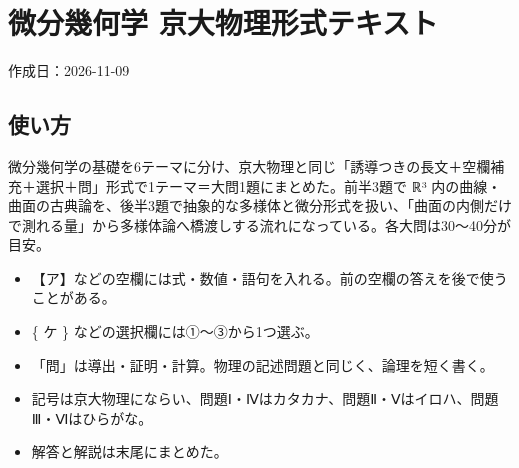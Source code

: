 \documentclass[
  10pt,
  a4paper,
]{article}
\author{}
\date{}
\providecommand{\tightlist}{%
  \setlength{\itemsep}{0pt}\setlength{\parskip}{0pt}}
\begin{document}
\hypertarget{ux5faeux5206ux5e7eux4f55ux5b66-ux4eacux5927ux7269ux7406ux5f62ux5f0fux30c6ux30adux30b9ux30c8}{%
\section{微分幾何学
京大物理形式テキスト}\label{ux5faeux5206ux5e7eux4f55ux5b66-ux4eacux5927ux7269ux7406ux5f62ux5f0fux30c6ux30adux30b9ux30c8}}

作成日：2026-11-09

\hypertarget{ux4f7fux3044ux65b9}{%
\subsection{使い方}\label{ux4f7fux3044ux65b9}}

微分幾何学の基礎を6テーマに分け、京大物理と同じ「誘導つきの長文＋空欄補充＋選択＋問」形式で1テーマ＝大問1題にまとめた。前半3題で
{\fallbackfont ℝ}³
内の曲線・曲面の古典論を、後半3題で抽象的な多様体と微分形式を扱い、「曲面の内側だけで測れる量」から多様体論へ橋渡しする流れになっている。各大問は30〜40分が目安。

\begin{itemize}
\tightlist
\item
  【ア】などの空欄には式・数値・語句を入れる。前の空欄の答えを後で使うことがある。
\item
  \{ ケ \} などの選択欄には①〜③から1つ選ぶ。
\item
  「問」は導出・証明・計算。物理の記述問題と同じく、論理を短く書く。
\item
  記号は京大物理にならい、問題Ⅰ・Ⅳはカタカナ、問題Ⅱ・Ⅴはイロハ、問題Ⅲ・Ⅵはひらがな。
\item
  解答と解説は末尾にまとめた。
\end{itemize}
\end{document}
